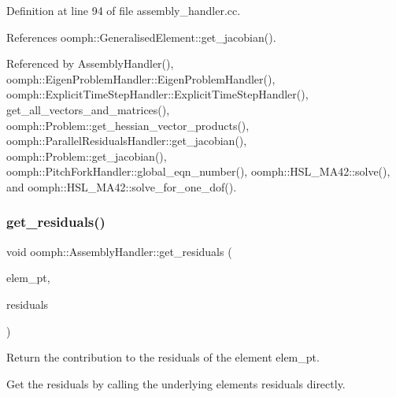 Definition at line 94 of file assembly\+\_\+handler.\+cc.



References oomph\+::\+Generalised\+Element\+::get\+\_\+jacobian().



Referenced by Assembly\+Handler(), oomph\+::\+Eigen\+Problem\+Handler\+::\+Eigen\+Problem\+Handler(), oomph\+::\+Explicit\+Time\+Step\+Handler\+::\+Explicit\+Time\+Step\+Handler(), get\+\_\+all\+\_\+vectors\+\_\+and\+\_\+matrices(), oomph\+::\+Problem\+::get\+\_\+hessian\+\_\+vector\+\_\+products(), oomph\+::\+Parallel\+Residuals\+Handler\+::get\+\_\+jacobian(), oomph\+::\+Problem\+::get\+\_\+jacobian(), oomph\+::\+Pitch\+Fork\+Handler\+::global\+\_\+eqn\+\_\+number(), oomph\+::\+H\+S\+L\+\_\+\+M\+A42\+::solve(), and oomph\+::\+H\+S\+L\+\_\+\+M\+A42\+::solve\+\_\+for\+\_\+one\+\_\+dof().

\mbox{\label{classoomph_1_1AssemblyHandler_a7a6203b0ab90da62b4da2af8a26d08b3}} 
\subsubsection{\texorpdfstring{get\+\_\+residuals()}{get\_residuals()}}
{\footnotesize\ttfamily void oomph\+::\+Assembly\+Handler\+::get\+\_\+residuals (\begin{DoxyParamCaption}\item[{\hyperlink{classoomph_1_1GeneralisedElement}{Generalised\+Element} $\ast$const \&}]{elem\+\_\+pt,  }\item[{\hyperlink{classoomph_1_1Vector}{Vector}$<$ double $>$ \&}]{residuals }\end{DoxyParamCaption})\hspace{0.3cm}{\ttfamily [virtual]}}



Return the contribution to the residuals of the element elem\+\_\+pt. 

Get the residuals by calling the underlying element\textquotesingle{}s residuals directly. 

